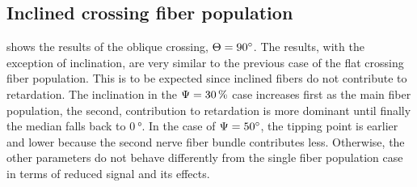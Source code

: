 \subsection{Inclined crossing fiber population}
 shows the results of the oblique crossing, \ie{} $\textnormal{$\Theta$}=\SI{90}{\degree}$.
The results, with the exception of inclination, are very similar to the previous case of the flat crossing fiber population.
This is to be expected since inclined fibers do not contribute to retardation.
The inclination in the $\textnormal{$\Psi$}=\SI{30}{\percent}$ case increases first as the main fiber population, \ie{} the second, contribution to retardation is more dominant until finally the median falls back to $\SI{0}{\degree}$.
In the case of $\textnormal{$\Psi$}=\SI{50}{\degree}$, the tipping point is earlier and lower because the second nerve fiber bundle contributes less.
Otherwise, the other parameters do not behave differently from the single fiber population case in terms of reduced signal and its effects.
%
%
%
